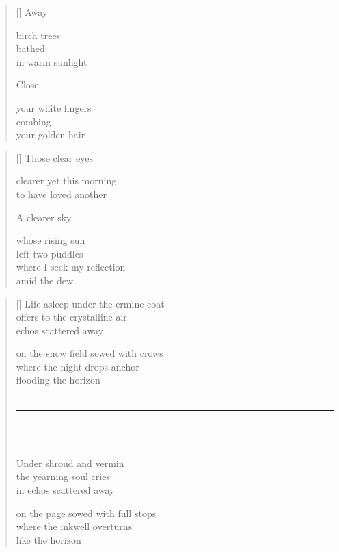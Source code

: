 \documentclass[12pt,a4paper]{article}
\begin{document}
\poemtitle{}

\settowidth{\versewidth}{your white fingers}

\bigskip

\begin{verse}[\versewidth]
  Away

  birch trees \\
  bathed \\
  in warm sunlight

  Close

  your white fingers \\
  combing \\
  your golden hair
\end{verse}


\newpage

\poemtitle{}

\settowidth{\versewidth}{where I seek my reflection}

\bigskip

\begin{verse}[\versewidth]
  Those clear eyes

  clearer yet this morning \\
  to have loved another

  A clearer sky

  whose rising sun \\
  left two puddles \\
  where I seek my reflection \\
  amid the dew
\end{verse}


\newpage

\poemtitle{}

\settowidth{\versewidth}{offers to the cristalline air echos}

\bigskip\bigskip

\begin{verse}[\versewidth]
  Life asleep under the ermine coat \\
  offers to the crystalline air \\
  echos scattered away

  on the snow field sowed with crows \\
  where the night drops anchor \\
  flooding the horizon \\ \

  \rule{0.4\textwidth}{0.4pt}
  \\ \

  Under shroud and vermin \\
  the yearning soul cries \\
  in echos scattered away

  on the page sowed with full stops \\
  where the inkwell overturns \\
  like the horizon
\end{verse}
\end{document}
